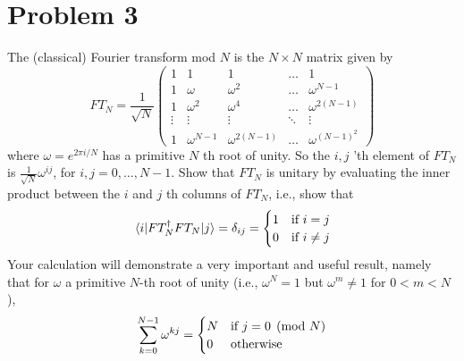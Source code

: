 \documentclass[10pt]{article}
\begin{document}
	\section*{Problem 3} 
	The (classical) Fourier transform mod \( N \) is the \( N \times N \) matrix given by 
	\[
		FT_{N} = \frac{1}{\sqrt{N} }\begin{pmatrix} 1 & 1 & 1 & \dots & 1\\
			1 & \omega & \omega^2 & \dots & \omega^{N - 1}\\
			1 & \omega^2 & \omega^{4} & \dots & \omega^{2(N - 1)}\\
			\vdots & \vdots & \vdots & \ddots & \vdots\\
			1 & \omega^{N - 1} & \omega^{2(N - 1)} & \dots & \omega^{(N - 1)^2}\end{pmatrix} 
	\] 
	where \( \omega = e^{2 \pi i / N} \) has a primitive \( N \) th root of unity. So the \( i, j \) 'th 
	element of \( FT_N \) is \( \frac{1}{\sqrt{N} }\omega^{ij} \), for \( i, j = 0, \dots, N - 1 \). Show that 
	\( FT_N \) is unitary by evaluating the inner product between the \( i \) and \( j \) th columns of 
	\( FT_N \), i.e., show that 
	\[
		\mel{i}{FT_N^{\dagger}FT_N}{j} = \delta_{ij} = \begin{cases}
			1 & \text{if \( i = j \)}\\
			0 & \text{if \( i \neq j \)}
		\end{cases}
	\] 
	Your calculation will demonstrate a very important and useful result, namely that for \( \omega \) a primitive 
	\( N \)-th root of unity (i.e.,  \( \omega^{N} = 1 \) but \( \omega^{m} \neq 1 \) for \( 0 < m < N \)), 
	\[
	\sum_{k=0}^{N - 1} \omega^{kj} = \begin{cases}
		N & \text{if \( j = 0 \pmod N \)}\\
		0 & \text{otherwise}
	\end{cases}
	\]
\end{document}
